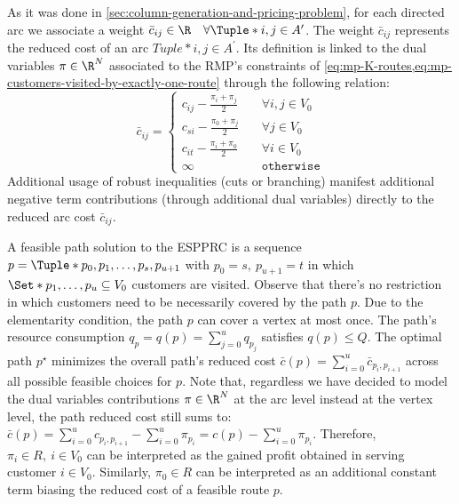 As it was done in \cref{sec:column-generation-and-pricing-problem},
for each directed arc we associate a weight
$\bar{c}_{ij} \in \R \quad \forall \Tuple*{i, j} \in A^\prime$.
The weight $\bar{c}_{ij}$ represents the reduced cost of an arc $Tuple*{i, j} \in A^\prime$.
Its definition is linked to the dual variables $\pi \in \R^N$ associated to
the RMP's constraints of \cref{eq:mp-K-routes,eq:mp-customers-visited-by-exactly-one-route}
through the following relation:
\begin{equation}
	\bar{c}_{ij} = \begin{cases}
		c_{ij} - \frac{\pi_i + \pi_j}{2} & \quad \forall i, j \in V_0 \\
		c_{si} - \frac{\pi_0 + \pi_j}{2} & \quad \forall j \in V_0    \\
		c_{it} - \frac{\pi_i + \pi_0}{2} & \quad \forall i \in V_0    \\
		\infty                           & \quad \texttt{otherwise}
	\end{cases}
\end{equation}
Additional usage of robust inequalities (cuts or branching) manifest
additional negative term contributions (through additional dual variables)
directly to the reduced arc cost $\bar{c}_{ij}$.

A feasible path solution to the ESPPRC is a sequence $p = \Tuple*{p_0, p_1, \dots, p_s, p_{u+1}}$
with $p_0 = s, \ p_{u + 1} = t$
in which $\Set*{p_1, \dots, p_u} \subseteq V_0$ customers are visited.
Observe that there's no restriction in which customers need to be necessarily covered
by the path $p$.
Due to the elementarity condition, the path $p$ can cover a vertex at most once.
The path's resource consumption $q_p = q(p) = \sum_{j=0}^{u} q_{p_j}$
satisfies $q(p) \le Q$.
The optimal path $p^\star$ minimizes the overall path's reduced cost
$\bar{c}(p) = \sum_{i=0}^{u} \bar{c}_{p_i,p_{i+1}}$ across all
possible feasible choices for $p$.
Note that, regardless we have decided to model
the dual variables contributions $\pi \in \R^N$
at the arc level instead at the vertex level,
the path reduced cost still sums to:
$\bar{c}(p) = \sum_{i=0}^{u} c_{p_i,p_{i+1}} - \sum_{i=0}^{u} \pi_{p_i} = c(p) - \sum_{i=0}^{u} \pi_{p_i}$.
Therefore, $\pi_i \in R,\ i \in V_0$ can be interpreted as the
gained profit obtained in serving customer $i \in V_0$.
Similarly,
$\pi_0 \in R$ can be interpreted as an additional constant term
biasing the reduced cost of a feasible route $p$.

\medskip

